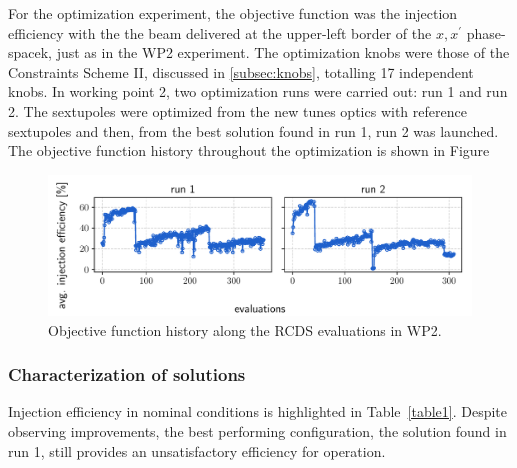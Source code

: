 For the optimization experiment, the objective function was the injection efficiency with the the beam delivered at the upper-left border of the $x,x^\prime$ phase-spacek, just as in the WP2 experiment. The optimization knobs were those of the Constraints Scheme II, discussed in \ref{subsec:knobs}, totalling 17 independent knobs. In working point 2, two optimization runs were carried out: run 1 and run 2. The sextupoles were optimized from the new tunes optics with reference sextupoles and then, from the best solution found in run 1, run 2 was launched. The objective function history throughout the optimization is shown in Figure
\begin{figure}
    \includegraphics[width=\columnwidth]{Images/wp2_objfunc_hist.pdf}
    \caption[Objective function history along the RCDS evaluations in WP2.]{Objective function history along the RCDS evaluations in WP2.}
\end{figure}
\subsubsection{Characterization of solutions}
Injection efficiency in nominal conditions is highlighted in Table~\ref{table1}. Despite observing improvements, the best performing configuration, the solution found in run 1, still provides an unsatisfactory efficiency for operation.


